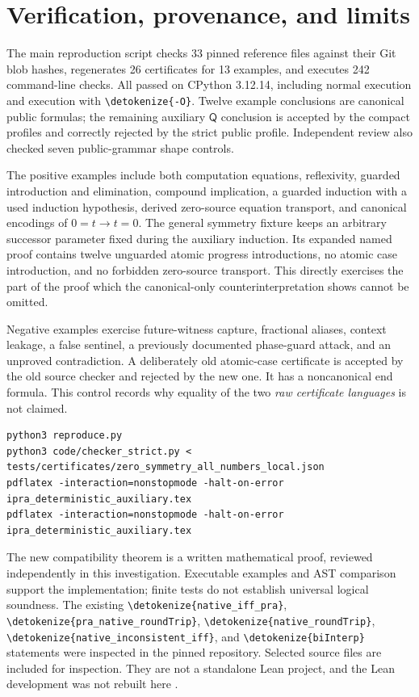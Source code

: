\documentclass[11pt,letterpaper]{article}
\theoremstyle{definition}\newtheorem{definition}[theorem]{Definition}
\theoremstyle{remark}\newtheorem{remark}[theorem]{Remark}
\newcommand{\Q}{\mathsf Q}
\newcommand{\file}[1]{\expandafter\nolinkurl\expandafter{\detokenize{#1}}}
\begin{document}
\section{Verification, provenance, and limits}

The main reproduction script checks 33 pinned reference files against
their Git blob hashes, regenerates 26 certificates for 13 examples, and
executes 242 command-line checks. All passed on CPython 3.12.14, including
normal execution and execution with \file{-O}. Twelve example conclusions
are canonical public formulas; the remaining auxiliary $\Q$ conclusion
is accepted by the compact profiles and correctly rejected by the strict
public profile. Independent review also checked seven public-grammar
shape controls.

The positive examples include both computation equations, reflexivity,
guarded introduction and elimination, compound implication, a guarded
induction with a used induction hypothesis, derived zero-source equation
transport, and canonical encodings of $0=t\to t=0$. The general symmetry
fixture keeps an arbitrary successor parameter fixed during the auxiliary
induction. Its expanded named proof contains twelve unguarded atomic
progress introductions, no atomic case introduction, and no forbidden
zero-source transport. This directly exercises the part of the proof
which the canonical-only counterinterpretation shows cannot be omitted.

Negative examples exercise future-witness capture, fractional aliases,
context leakage, a false sentinel, a previously documented phase-guard
attack, and an unproved contradiction. A deliberately old atomic-case
certificate is accepted by the old source checker and rejected by the new
one. It has a noncanonical end formula. This control records why equality
of the two \emph{raw certificate languages} is not claimed.

\begin{lstlisting}[language={}]
python3 reproduce.py
python3 code/checker_strict.py < tests/certificates/zero_symmetry_all_numbers_local.json
pdflatex -interaction=nonstopmode -halt-on-error ipra_deterministic_auxiliary.tex
pdflatex -interaction=nonstopmode -halt-on-error ipra_deterministic_auxiliary.tex
\end{lstlisting}

The new compatibility theorem is a written mathematical proof, reviewed
independently in this investigation. Executable examples and AST comparison
support the implementation; finite tests do not establish universal logical
soundness. The existing \file{native_iff_pra},
\file{pra_native_roundTrip}, \file{native_roundTrip},
\file{native_inconsistent_iff}, and \file{biInterp} statements were inspected
in the pinned repository. Selected source files are included for inspection.
They are not a standalone Lean project, and the Lean development was not
rebuilt here \cite{lean-native,lean-bi}.
\end{document}
